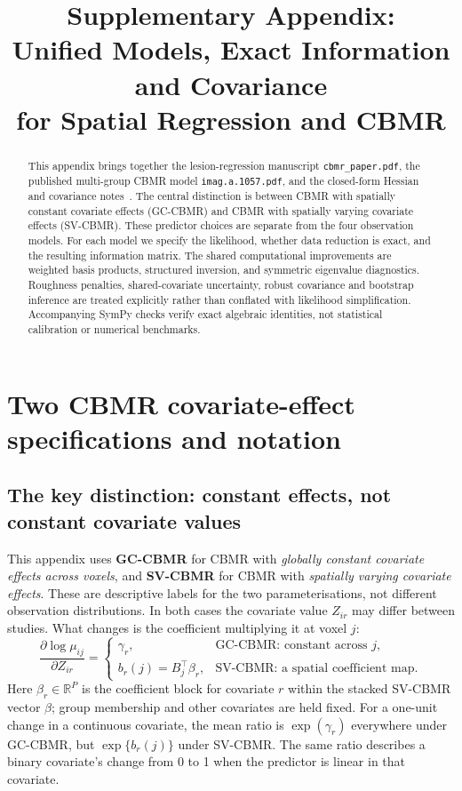 \documentclass[11pt,a4paper]{article}
\title{Supplementary Appendix:\\
Unified Models, Exact Information and Covariance\\
for Spatial Regression and CBMR}
\author{}
\date{}
\newcommand{\R}{\mathbb{R}}
\numberwithin{equation}{section}
\begin{document}
\maketitle
\vspace{-2em}
\begin{abstract}
This appendix brings together the lesion-regression manuscript
\texttt{cbmr\_paper.pdf}, the published multi-group CBMR model
\texttt{imag.a.1057.pdf}, and the closed-form Hessian and covariance
notes~\cite{hessian,covariance}.
The central distinction is between CBMR with spatially constant covariate
effects (GC-CBMR) and CBMR with spatially varying covariate effects
(SV-CBMR). These predictor choices are separate from the four observation models.
For each model we specify the likelihood, whether data reduction is exact,
and the resulting information matrix. The shared computational improvements
are weighted basis products, structured inversion, and symmetric
eigenvalue diagnostics. Roughness penalties, shared-covariate uncertainty,
robust covariance and bootstrap inference are treated explicitly rather than
conflated with likelihood simplification. Accompanying SymPy checks verify
exact algebraic identities, not statistical calibration or numerical benchmarks.
\end{abstract}
\tableofcontents
\clearpage

\section{Two CBMR covariate-effect specifications and notation}\label{sec:notation}

\subsection{The key distinction: constant effects, not constant covariate values}
This appendix uses \textbf{GC-CBMR} for CBMR with \emph{globally constant
covariate effects across voxels}, and \textbf{SV-CBMR} for CBMR with
\emph{spatially varying covariate effects}. These are descriptive labels
for the two parameterisations, not different observation distributions.
In both cases the covariate value $Z_{ir}$ may differ between studies.
What changes is the coefficient multiplying it at voxel $j$:
\begin{equation}\label{eq:effect-distinction}
 \frac{\partial\log\mu_{ij}}{\partial Z_{ir}}=
 \begin{cases}
 \gamma_r,&\text{GC-CBMR: constant across }j,\\
 b_r(j)=B_j^\top\beta_r,&\text{SV-CBMR: a spatial coefficient map}.
 \end{cases}
\end{equation}
Here $\beta_r\in\R^P$ is the coefficient block for covariate $r$ within the
stacked SV-CBMR vector $\beta$; group membership and other covariates are
held fixed. For a one-unit change in a continuous covariate, the mean ratio
is $\exp(\gamma_r)$ everywhere under GC-CBMR, but
$\exp\{b_r(j)\}$ under SV-CBMR. The same ratio describes a binary
covariate's change from 0 to 1 when the predictor is linear in that covariate.
\end{document}
